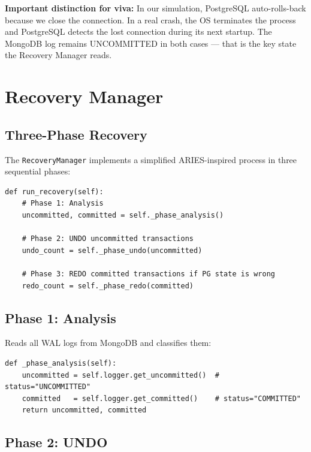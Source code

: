 \begin{conceptbox}
\textbf{Important distinction for viva:}
In our simulation, PostgreSQL auto-rolls-back because we close the connection.
In a real crash, the OS terminates the process and PostgreSQL detects the
lost connection during its next startup. The MongoDB log remains UNCOMMITTED
in both cases --- that is the key state the Recovery Manager reads.
\end{conceptbox}

\chapter{Recovery Manager}

\section{Three-Phase Recovery}

The \texttt{RecoveryManager} implements a simplified ARIES-inspired process
in three sequential phases:

\begin{lstlisting}[style=pythonstyle, caption={recovery\_manager.py --- main entry point}]
def run_recovery(self):
    # Phase 1: Analysis
    uncommitted, committed = self._phase_analysis()

    # Phase 2: UNDO uncommitted transactions
    undo_count = self._phase_undo(uncommitted)

    # Phase 3: REDO committed transactions if PG state is wrong
    redo_count = self._phase_redo(committed)
\end{lstlisting}

\section{Phase 1: Analysis}

Reads all WAL logs from MongoDB and classifies them:

\begin{lstlisting}[style=pythonstyle, caption={Analysis phase}]
def _phase_analysis(self):
    uncommitted = self.logger.get_uncommitted()  # status="UNCOMMITTED"
    committed   = self.logger.get_committed()    # status="COMMITTED"
    return uncommitted, committed
\end{lstlisting}

\section{Phase 2: UNDO}

